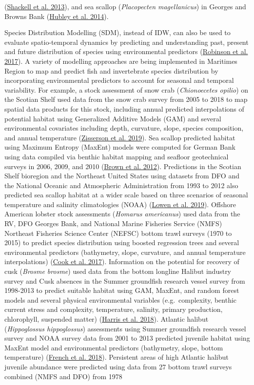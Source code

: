 \documentclass[12pt]{article}\usepackage[]{graphicx}\usepackage[]{color}
\begin{document}
(\protect\hyperlink{ref-Shackell2013}{Shackell et al. 2013}), and sea scallop (\emph{Placopecten magellanicus}) in Georges and Browns Bank (\protect\hyperlink{ref-Hubley2013}{Hubley et al. 2014}).

Species Distribution Modelling (SDM), instead of IDW, can also be used to evaluate spatio-temporal dynamics by predicting and understanding past, present and future distribution of species using environmental predictors (\protect\hyperlink{ref-Robinson:2017}{Robinson et al. 2017}). A variety of modelling approaches are being implemented in Maritimes Region to map and predict fish and invertebrate species distribution by incorporating environmental predictors to account for seasonal and temporal variability. For example, a stock assessment of snow crab (\emph{Chionoecetes opilio}) on the Scotian Shelf used data from the snow crab survey from 2005 to 2018 to map spatial data products for this stock, including annual predicted interpolations of potential habitat using Generalized Additive Models (GAM) and several environmental covariates including depth, curvature, slope, species composition, and annual temperature (\protect\hyperlink{ref-Zisserson2019}{Zisserson et al. 2019}). Sea scallop predicted habitat using Maximum Entropy (MaxEnt) models were computed for German Bank using data compiled via benthic habitat mapping and seafloor geotechnical surveys in 2006, 2009, and 2010 (\protect\hyperlink{ref-Brown:2012}{Brown et al. 2012}). Predictions in the Scotian Shelf bioregion and the Northeast United States using datasets from DFO and the National Oceanic and Atmospheric Administration from 1993 to 2012 also predicted sea scallop habitat at a wider scale based on three scenarios of seasonal temperature and salinity climatologies (NOAA) (\protect\hyperlink{ref-Lowen:2019}{Lowen et al. 2019}). Offshore American lobster stock assessments (\emph{Homarus americanus}) used data from the RV, DFO Georges Bank, and National Marine Fisheries Service (NMFS) Northeast Fisheries Science Center (NEFSC) bottom trawl surveys (1970 to 2015) to predict species distribution using boosted regression trees and several environmental predictors (bathymetry, slope, curvature, and annual temperature interpolations) (\protect\hyperlink{ref-Cook:2017}{Cook et al. 2017}). Information on the potential for recovery of cusk (\emph{Brosme brosme}) used data from the bottom longline Halibut industry survey and Cusk absences in the Summer groundfish research vessel survey from 1998-2013 to predict suitable habitat using GAM, MaxEnt, and random forest models and several physical environmental variables (e.g.~complexity, benthic current stress and complexity, temperature, salinity, primary production, chlorophyll, suspended matter) (\protect\hyperlink{ref-Harris:2018}{Harris et al. 2018}). Atlantic halibut (\emph{Hippoglossus hippoglossus}) assessments using Summer groundfish research vessel survey and NOAA survey data from 2001 to 2013 predicted juvenile habitat using MaxEnt model and environmental predictors (bathymetry, slope, bottom temperature) (\protect\hyperlink{ref-French:2018}{French et al. 2018}). Persistent areas of high Atlantic halibut juvenile abundance were predicted using data from 27 bottom trawl surveys combined (NMFS and DFO) from 1978 
\end{document}
